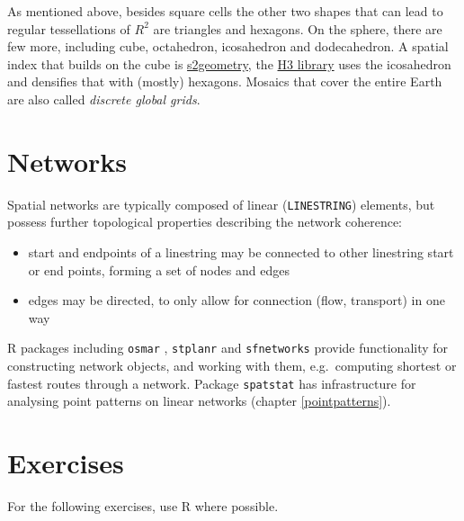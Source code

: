 \documentclass[]{book}
\providecommand{\tightlist}{%
  \setlength{\itemsep}{0pt}\setlength{\parskip}{0pt}}
\begin{document}
As mentioned above, besides square cells the other two shapes
that can lead to regular tessellations of \(R^2\) are triangles
and hexagons. On the sphere, there are few more, including cube,
octahedron, icosahedron and dodecahedron. A spatial index that
builds on the cube is \href{https://s2geometry.io/}{s2geometry}, the
\href{https://eng.uber.com/h3/}{H3 library} uses the icosahedron and
densifies that with (mostly) hexagons. Mosaics that cover the entire
Earth are also called \emph{discrete global grids}.

\hypertarget{networks}{%
\section{Networks}\label{networks}}

Spatial networks are typically composed of linear (\texttt{LINESTRING})
elements, but possess further topological properties describing
the network coherence:

\begin{itemize}
\tightlist
\item
  start and endpoints of a linestring may be connected to other linestring
  start or end points, forming a set of nodes and edges
\item
  edges may be directed, to only allow for connection (flow,
  transport) in one way
\end{itemize}

R packages including \texttt{osmar} \citep{R-osmar}, \texttt{stplanr} \citep{R-stplanr} and
\texttt{sfnetworks} \citep{R-sfnetworks} provide functionality for constructing
network objects, and working with them, e.g.~computing shortest or
fastest routes through a network. Package \texttt{spatstat} \citep{R-spatstat, baddeley2015spatial} has infrastructure for analysing point patterns
on linear networks (chapter \ref{pointpatterns}).

\hypertarget{exercises-2}{%
\section{Exercises}\label{exercises-2}}

For the following exercises, use R where possible.
\end{document}

